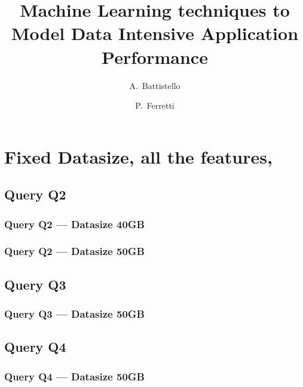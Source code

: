 \documentclass[a4paper,11pt]{article}
\author{A.~Battistello\and P.~Ferretti}
\title{Machine Learning techniques to Model Data Intensive Application Performance}
\date{}
\begin{document}
\maketitle
\tableofcontents





\newpage
\section{Fixed Datasize, all the features,}
\subsection{Query Q2}
\subsubsection{Query Q2 --- Datasize 40GB}



\newpage
\subsubsection{Query Q2 --- Datasize 50GB}



\newpage

\subsection{Query Q3}
\subsubsection{Query Q3 --- Datasize 50GB}



\newpage

\subsection{Query Q4}
\subsubsection{Query Q4 --- Datasize 50GB}



\newpage
\end{document}
